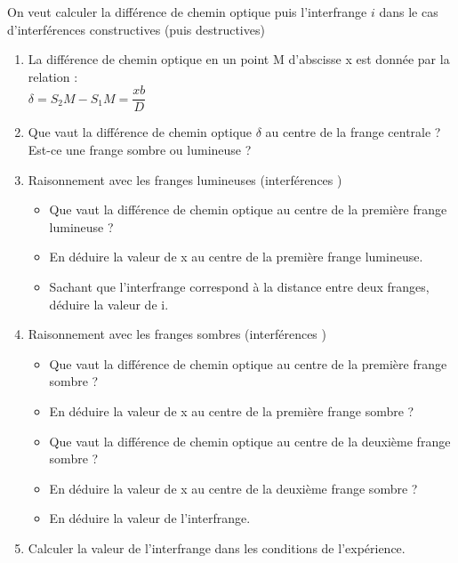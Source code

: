  On veut calculer la différence de chemin optique puis l'interfrange $i$ dans le cas d'interférences constructives (puis destructives)
\\
\begin{enumerate}
\item La différence de chemin optique en un point M d'abscisse x est donnée par la relation : \\$\delta=S_2M-S_1M=\dfrac{xb}{D}$ \\

\item Que vaut la différence de chemin optique $\delta$ au centre de la frange centrale ? Est-ce une frange sombre ou lumineuse ?\\
 
\item Raisonnement avec les franges lumineuses (interférences ) 
\begin{itemize}
\item Que vaut la différence de chemin optique au centre de la première frange lumineuse ? \trou{$\delta=\lambda$}
\item En déduire la valeur de x au centre de la première frange lumineuse.\\
\item Sachant que l'interfrange correspond à la distance entre deux franges, déduire la valeur de i.\\
\end{itemize}

\item Raisonnement avec les franges sombres (interférences )
\begin{itemize}
\item Que vaut la différence de chemin optique au centre de la première frange sombre ?\\
\item En déduire la valeur de x au centre de la première frange sombre ?
\item Que vaut la différence de chemin optique au centre de la deuxième frange sombre ?\\
\item En déduire la valeur de x au centre de la deuxième frange sombre ?\\
\item En déduire la valeur de l'interfrange.\\
\end{itemize}
\item Calculer la valeur de l'interfrange dans les conditions de l'expérience.\\
\end{enumerate}

